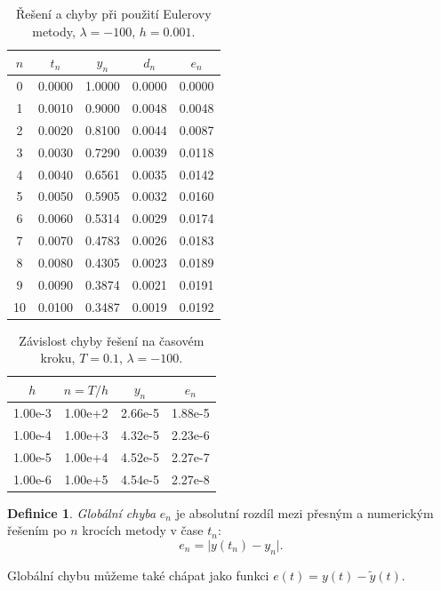 \documentclass[a4paper, 12pt]{book}
\theoremstyle{definition}
\newtheorem{definition}[theorem]{Definice}
\def\abs#1{\lvert#1\rvert}
\def\df#1{\emph{#1}}
\begin{document}
\begin{table}
\centering
\begin{tabular}{|c|c|c|c|c|}
\hline
$n$ & $t_n$ & $y_n$ & $d_n$ & $e_n$\\ 
\hline
0 & 0.0000 & 1.0000 & 0.0000 & 0.0000\\ 
\hline
1 & 0.0010 & 0.9000 & 0.0048 & 0.0048\\ 
\hline
2 & 0.0020 & 0.8100 & 0.0044 & 0.0087\\ 
\hline
3 & 0.0030 & 0.7290 & 0.0039 & 0.0118\\ 
\hline
4 & 0.0040 & 0.6561 & 0.0035 & 0.0142\\ 
\hline
5 & 0.0050 & 0.5905 & 0.0032 & 0.0160\\ 
\hline
6 & 0.0060 & 0.5314 & 0.0029 & 0.0174\\ 
\hline
7 & 0.0070 & 0.4783 & 0.0026 & 0.0183\\ 
\hline
8 & 0.0080 & 0.4305 & 0.0023 & 0.0189\\ 
\hline
9 & 0.0090 & 0.3874 & 0.0021 & 0.0191\\ 
\hline
10 & 0.0100 & 0.3487 & 0.0019 & 0.0192\\ 
\hline
\hline\end{tabular}
\label{table:reseni}
\caption{Řešení a chyby při použití Eulerovy metody, $\lambda=-100$, $h=0.001$.} 
\end{table}

 \begin{table}
\centering
\begin{tabular}{|c|c|c|c|}
\hline
$h$ & $n=T/h$ & $y_n$ & $e_n$\\ 
\hline
1.00e-3 & 1.00e+2 & 2.66e-5 & 1.88e-5\\ 
\hline
1.00e-4 & 1.00e+3 & 4.32e-5 & 2.23e-6\\ 
\hline
1.00e-5 & 1.00e+4 & 4.52e-5 & 2.27e-7\\ 
\hline
1.00e-6 & 1.00e+5 & 4.54e-5 & 2.27e-8\\ 
\hline
\hline\end{tabular}
\label{table:konvergence}
\caption{Závislost chyby řešení na časovém kroku, $T=0.1$, $\lambda=-100$.} 
\end{table}

\begin{definition}
 \df{Globální chyba} $e_n$ je absolutní rozdíl mezi přesným a numerickým řešením po $n$ krocích metody v čase $t_n$:
 \[
    e_n = \abs{ y(t_n) - y_n}.
 \]
\end{definition}
Globální chybu můžeme také chápat jako funkci $e(t) = y(t) - \tilde y(t)$.
\end{document}
